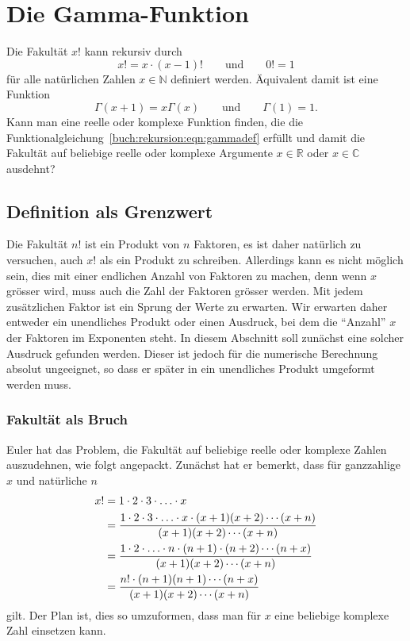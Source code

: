 %
%
%
\section{Die Gamma-Funktion
\label{buch:rekursion:section:gamma}}
Die Fakultät $x!$ kann rekursiv durch 
\[
	x! = x\cdot (x-1)! \qquad\text{und}\qquad 0!=1
\]
für alle natürlichen Zahlen $x\in\mathbb{N}$ definiert werden.
Äquivalent damit ist eine Funktion 
\begin{equation}
\Gamma(x+1) = x\Gamma(x)
\qquad\text{und}\qquad 
\Gamma(1)=1.
\label{buch:rekursion:eqn:gammadef}
\end{equation}
Kann man eine reelle oder komplexe Funktion finden, die die
Funktionalgleichung~\eqref{buch:rekursion:eqn:gammadef}
%
%
erfüllt und damit die Fakultät auf beliebige reelle oder komplexe
Argumente $x\in\mathbb{R}$ oder $x\in\mathbb{C}$ ausdehnt?

%
%
\subsection{Definition als Grenzwert}
Die Fakultät $n!$ ist ein Produkt von $n$ Faktoren, es ist daher
natürlich zu versuchen, auch $x!$ als ein Produkt zu schreiben.
Allerdings kann es nicht möglich sein, dies mit einer endlichen
Anzahl von Faktoren zu machen, denn wenn $x$ grösser wird, muss auch
die Zahl der Faktoren grösser werden.
Mit jedem zusätzlichen Faktor ist ein Sprung der Werte zu erwarten.
Wir erwarten daher entweder ein unendliches Produkt oder einen
Ausdruck, bei dem die ``Anzahl'' $x$ der Faktoren im Exponenten
steht.
In diesem Abschnitt soll zunächst eine solcher Ausdruck gefunden
werden.
Dieser ist jedoch für die numerische Berechnung absolut ungeeignet,
so dass er später in ein unendliches Produkt umgeformt werden muss.

%
%
\subsubsection{Fakultät als Bruch}
Euler hat das Problem, die Fakultät auf beliebige reelle oder komplexe
Zahlen auszudehnen, wie folgt angepackt.
Zunächst hat er bemerkt, dass für ganzzahlige $x$ und natürliche $n$
\begin{align}
x! 
&=
1\cdot 2\cdot 3\cdot\ldots\cdot x
\notag
\\
&=
\frac{
1\cdot 2\cdot 3\cdot\ldots\cdot x\cdot (x+1) (x+2)\cdots(x+n)
}{
(x+1)(x+2)\cdots(x+n)
}
\notag
\\
&=
\frac{
1\cdot 2\cdot\ldots\cdot n\cdot(n+1)\cdot(n+2)\cdots(n+x)
}{
(x+1)(x+2)\cdots(x+n)
}
\notag
\\
&=
\frac{n! \cdot (n+1)(n+1)\cdots(n+x)}{(x+1)(x+2)\cdots(x+n)}
\label{buch:rekursion:gamma:eqn:fakultaet}
\end{align}
gilt.
Der Plan ist, dies so umzuformen, dass man für $x$ eine beliebige
komplexe Zahl einsetzen kann.

